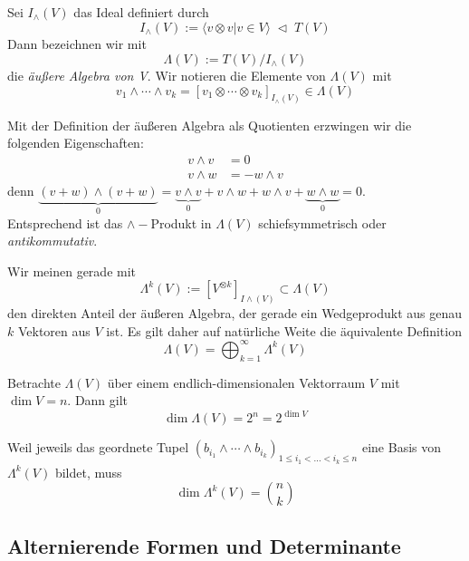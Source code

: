 \documentclass[11pt, a4paper]{article}
\begin{document}
\begin{definition} Sei $I_\wedge (V)$ das Ideal definiert durch
$$I_\wedge(V) := \langle v\otimes v | v\in V\rangle\; \triangleleft\;  T(V)$$
Dann bezeichnen wir mit 
$$\Lambda(V):= T(V)/I_\wedge(V)$$
die \emph{äußere Algebra von V}. Wir notieren die Elemente von $\Lambda (V)$ mit 
$$v_1 \wedge \cdots \wedge v_k = [v_1 \otimes \cdots \otimes v_k]_{I_\wedge (V)} \in \Lambda (V)$$
\end{definition}

\begin{note}
    Mit der Definition der äußeren Algebra als Quotienten erzwingen wir die folgenden Eigenschaften:
\begin{align*}
    v\wedge v &= 0\\
    v\wedge w &= - w\wedge v
\end{align*}
denn $\underbrace{(v+w)\wedge (v+w)}_{0} = \underbrace{v\wedge v}_{0} +v\wedge w + w\wedge v +\underbrace{w\wedge w}_{0} = 0$.\\
Entsprechend ist das $\wedge-$Produkt in $\Lambda (V)$ schiefsymmetrisch oder \emph{antikommutativ}.
\end{note}

\begin{definition} 
    Wir meinen gerade mit $$\Lambda^k (V):=[V^{\otimes k}]_{I\wedge (V)} \subset \Lambda (V)$$
    den direkten Anteil der äußeren Algebra, der gerade ein Wedgeprodukt aus genau $k$ Vektoren aus $V$ ist. Es gilt daher auf natürliche Weite die äquivalente Definition
    $$\Lambda (V) = \bigoplus_{k=1}^\infty \Lambda^k(V)$$
\end{definition}

\begin{corollary}
Betrachte $\Lambda (V)$ über einem endlich-dimensionalen Vektorraum $V$ mit $\dim V= n$. Dann gilt
$$\dim\Lambda(V) = 2^n = 2^{\dim V}$$
\end{corollary}

\begin{corollary} Weil jeweils das geordnete Tupel 
$(b_{i_1} \wedge \cdots \wedge b_{i_k})_{1\leq i_1 < ... < i_k \leq n}$ eine Basis von $\Lambda^k (V)$ bildet, muss
$$\dim \Lambda^k (V) = \binom n k$$
\end{corollary}


\subsection{Alternierende Formen und Determinante}
\end{document}

